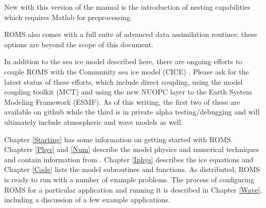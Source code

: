 New with this version of the manual is the introduction of nesting
capabilities which requires Matlab for preprocessing.

ROMS also comes with a full suite of advanced data assimilation
routines; these options are beyond the scope of this document.

In addition to the sea ice model described here, there are ongoing
efforts to couple ROMS with the Community sea ice model (CICE)
\citep{Hunke_2013}. Please ask for the latest status of these
efforts, which include direct coupling, using the model coupling
toolkit (MCT) and using the new NUOPC layer to the Earth System
Modeling Framework (ESMF). As of this writing, the first two of
these are available on github while the third is in private alpha
testing/debugging and will ultimately include atmospheric and wave
models as well.

Chapter \ref{Starting} has some information on getting started with
ROMS.
Chapters \ref{Phys} and \ref{Num} describe the model physics and
numerical techniques and contain information from 
\citet{SS2008b,Haidvogel07}.
Chapter \ref{Iphys} describes the ice equations and
Chapter \ref{Code} lists the model subroutines and functions.
As distributed, ROMS is ready to run with a number of example problems.
The process of configuring ROMS for a particular application and
running it is
described in Chapter \ref{Wave}, including a discussion of a few example
applications.
